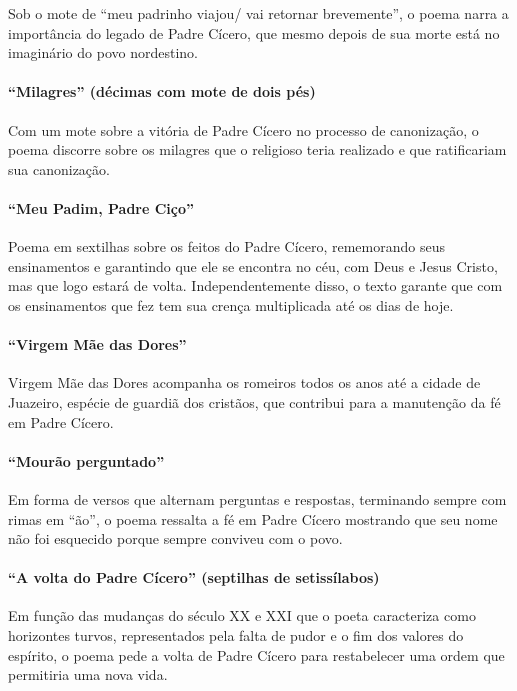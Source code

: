 Sob o mote de ``meu padrinho viajou/ vai retornar
brevemente'', o poema narra a importância do legado de Padre
Cícero, que mesmo depois de sua morte está no imaginário do povo nordestino.

\paragraph{``Milagres'' (décimas com mote de dois pés)}

Com um mote sobre a vitória de Padre Cícero no processo de canonização,
o poema discorre sobre os milagres que o religioso teria realizado e
que ratificariam sua canonização.

\paragraph{``Meu Padim, Padre Ciço''}

Poema em sextilhas sobre os feitos do Padre Cícero, rememorando seus
ensinamentos e garantindo que ele se encontra no céu, com Deus e Jesus
Cristo, mas que logo estará de volta. Independentemente disso, o texto
garante que com os ensinamentos que fez tem sua crença multiplicada até
os dias de hoje.

\paragraph{``Virgem Mãe das Dores''}

Virgem Mãe das Dores acompanha os romeiros todos os anos até a cidade de
Juazeiro, espécie de guardiã dos cristãos, que contribui para a manutenção da
fé em Padre Cícero.

\paragraph{``Mourão perguntado''}

Em forma de versos que alternam perguntas e respostas, terminando sempre
com rimas em ``ão'', o poema
ressalta a fé em Padre Cícero mostrando que seu nome não foi esquecido
porque sempre conviveu com o povo.

\paragraph{``A volta do Padre Cícero'' (septilhas de setissílabos) }

Em função das mudanças do século XX e XXI que o poeta caracteriza como
horizontes turvos, representados pela falta de pudor e o fim dos
valores do espírito, o poema pede a volta de Padre Cícero para
restabelecer uma ordem que permitiria uma nova vida.

